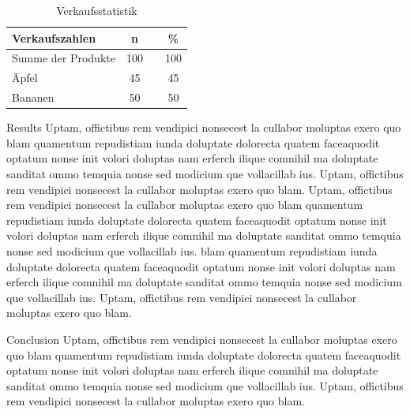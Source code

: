 \documentclass[final]{beamer}
\newlength{\onecolwid}
\begin{document}
\begin{frame}[t]
\begin{columns}[t]
\begin{column}{\onecolwid}
          \begin{table}[ht]
					\centering
					\begin{tabular}{lccc}
                    Verkaufszahlen & n 		& & \%  \\
					\hline
					Summe der Produkte 		& 100     	& & 100 \\
					Äpfel 	 				&  45      	& &  45 \\
					Bananen 					&  50 	   	& &  50 \\
				    \hline
				  \end{tabular}
				\caption{Verkaufsstatistik} 
                \label{Verkaufsstastik}
			  \end{table}
          
          
          \begin{block}{Results}
          Uptam, offictibus rem vendipici nonsecest la cullabor moluptas exero quo blam quamentum repudistiam iunda doluptate dolorecta quatem faceaquodit optatum nonse init volori doluptas nam erferch ilique comnihil ma doluptate sanditat ommo temquia nonse sed modicium que vollacillab ius. Uptam, offictibus rem vendipici nonsecest la cullabor moluptas exero quo blam.
Uptam, offictibus rem vendipici nonsecest la cullabor moluptas exero quo blam quamentum repudistiam iunda doluptate dolorecta quatem faceaquodit optatum nonse init volori doluptas nam erferch ilique comnihil ma doluptate sanditat ommo temquia nonse sed modicium que vollacillab ius. 
blam quamentum repudistiam iunda doluptate dolorecta quatem faceaquodit optatum nonse init volori doluptas nam erferch ilique comnihil ma doluptate sanditat ommo temquia nonse sed modicium que vollacillab ius. Uptam, offictibus rem vendipici nonsecest la cullabor moluptas exero quo blam.

          \end{block}
          
          
          \begin{block}{Conclusion}
          Uptam, offictibus rem vendipici nonsecest la cullabor moluptas exero quo blam quamentum repudistiam iunda doluptate dolorecta quatem faceaquodit optatum nonse init volori doluptas nam erferch ilique comnihil ma doluptate sanditat ommo temquia nonse sed modicium que vollacillab ius. Uptam, offictibus rem vendipici nonsecest la cullabor moluptas exero quo blam.
          \end{block}
          

\end{column}
\end{columns}
\end{frame}
\end{document}
